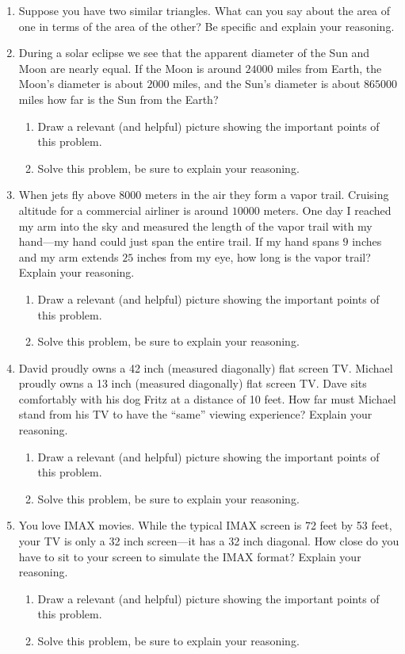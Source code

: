 \begin{enumerate}
\item Suppose you have two similar triangles. What can you say about
  the area of one in terms of the area of the other? Be specific and
  explain your reasoning.

\item During a solar eclipse we see that the apparent diameter of the
  Sun and Moon are nearly equal. If the Moon is around $24000$ miles
  from Earth, the Moon's diameter is about $2000$ miles, and the Sun's
  diameter is about $865000$ miles how far is the Sun from the Earth?
\begin{enumerate}
\item Draw a relevant (and helpful) picture showing the important
  points of this problem.
\item Solve this problem, be sure to explain your reasoning.
\end{enumerate}


\item When jets fly above $8000$ meters in the air they form a vapor
  trail. Cruising altitude for a commercial airliner is around $10000$
  meters. One day I reached my arm into the sky and measured the
  length of the vapor trail with my hand---my hand could just span the
  entire trail. If my hand spans $9$ inches and my arm extends $25$
  inches from my eye, how long is the vapor trail? Explain your
  reasoning.
\begin{enumerate}
\item Draw a relevant (and helpful) picture showing the important
  points of this problem.
\item Solve this problem, be sure to explain your reasoning.
\end{enumerate}

\item David proudly owns a 42 inch (measured diagonally) flat screen
  TV. Michael proudly owns a 13 inch (measured diagonally) flat screen
  TV. Dave sits comfortably with his dog Fritz at a distance of 10
  feet. How far must Michael stand from his TV to have the ``same''
  viewing experience?  Explain your reasoning.
\begin{enumerate}
\item Draw a relevant (and helpful) picture showing the important
  points of this problem.
\item Solve this problem, be sure to explain your reasoning.
\end{enumerate}

\item You love IMAX movies. While the typical IMAX screen is 72 feet
  by 53 feet, your TV is only a 32 inch screen---it has a 32 inch
  diagonal. How close do you have to sit to your screen to simulate
  the IMAX format? Explain your reasoning.
\begin{enumerate}
\item Draw a relevant (and helpful) picture showing the important
  points of this problem.
\item Solve this problem, be sure to explain your reasoning.
\end{enumerate}


\end{enumerate}
